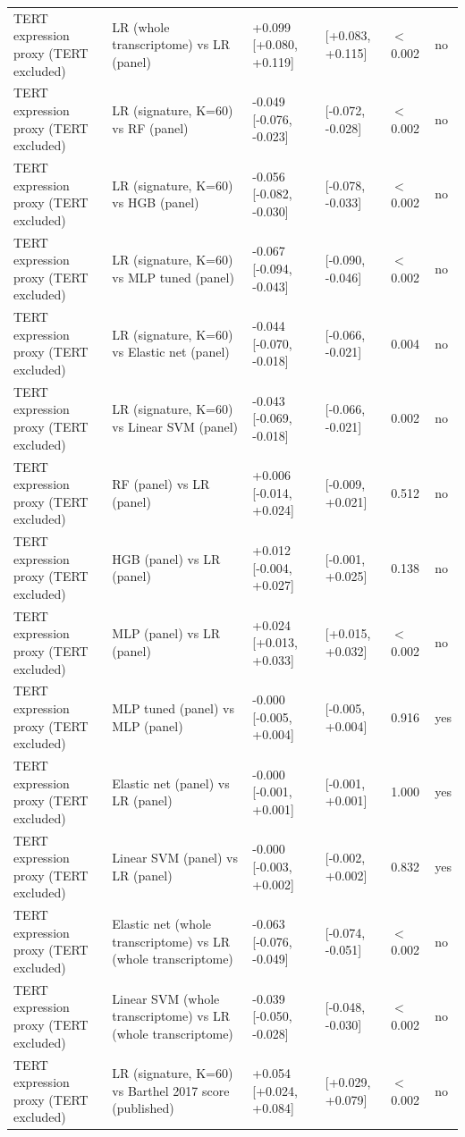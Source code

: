 \begin{longtable}{@{}>{\raggedright\arraybackslash}p{}>{\raggedright\arraybackslash}p{}p{}p{}p{}p{}@{}}
TERT expression proxy (TERT excluded) & LR (whole transcriptome) vs LR (panel) & +0.099 [+0.080, +0.119] & [+0.083, +0.115] & $<$0.002 & no \\
TERT expression proxy (TERT excluded) & LR (signature, K=60) vs RF (panel) & -0.049 [-0.076, -0.023] & [-0.072, -0.028] & $<$0.002 & no \\
TERT expression proxy (TERT excluded) & LR (signature, K=60) vs HGB (panel) & -0.056 [-0.082, -0.030] & [-0.078, -0.033] & $<$0.002 & no \\
TERT expression proxy (TERT excluded) & LR (signature, K=60) vs MLP tuned (panel) & -0.067 [-0.094, -0.043] & [-0.090, -0.046] & $<$0.002 & no \\
TERT expression proxy (TERT excluded) & LR (signature, K=60) vs Elastic net (panel) & -0.044 [-0.070, -0.018] & [-0.066, -0.021] & 0.004 & no \\
TERT expression proxy (TERT excluded) & LR (signature, K=60) vs Linear SVM (panel) & -0.043 [-0.069, -0.018] & [-0.066, -0.021] & 0.002 & no \\
TERT expression proxy (TERT excluded) & RF (panel) vs LR (panel) & +0.006 [-0.014, +0.024] & [-0.009, +0.021] & 0.512 & no \\
TERT expression proxy (TERT excluded) & HGB (panel) vs LR (panel) & +0.012 [-0.004, +0.027] & [-0.001, +0.025] & 0.138 & no \\
TERT expression proxy (TERT excluded) & MLP (panel) vs LR (panel) & +0.024 [+0.013, +0.033] & [+0.015, +0.032] & $<$0.002 & no \\
TERT expression proxy (TERT excluded) & MLP tuned (panel) vs MLP (panel) & -0.000 [-0.005, +0.004] & [-0.005, +0.004] & 0.916 & yes \\
TERT expression proxy (TERT excluded) & Elastic net (panel) vs LR (panel) & -0.000 [-0.001, +0.001] & [-0.001, +0.001] & 1.000 & yes \\
TERT expression proxy (TERT excluded) & Linear SVM (panel) vs LR (panel) & -0.000 [-0.003, +0.002] & [-0.002, +0.002] & 0.832 & yes \\
TERT expression proxy (TERT excluded) & Elastic net (whole transcriptome) vs LR (whole transcriptome) & -0.063 [-0.076, -0.049] & [-0.074, -0.051] & $<$0.002 & no \\
TERT expression proxy (TERT excluded) & Linear SVM (whole transcriptome) vs LR (whole transcriptome) & -0.039 [-0.050, -0.028] & [-0.048, -0.030] & $<$0.002 & no \\
TERT expression proxy (TERT excluded) & LR (signature, K=60) vs Barthel 2017 score (published) & +0.054 [+0.024, +0.084] & [+0.029, +0.079] & $<$0.002 & no \\

\end{longtable}
